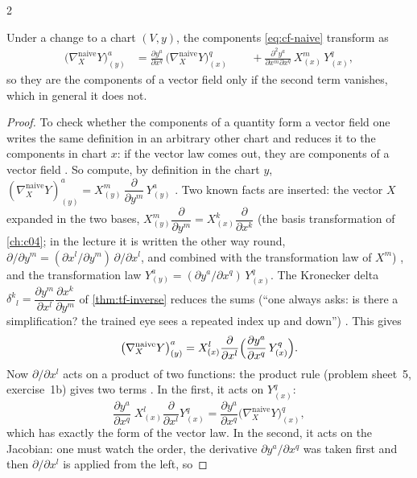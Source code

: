 \begin{paracol}{2}
\begin{theorem}\label{thm:cf-naive-fail}
Under a change to a chart $(V,y)$, the components \eqref{eq:cf-naive} transform as
\begin{align*}
  \bigl(\nabla^{\text{naive}}_XY\bigr)^a_{(y)}
  &=\frac{\partial y^a}{\partial x^q}\,\bigl(\nabla^{\text{naive}}_XY\bigr)^q_{(x)}\
  &\quad+\frac{\partial^2 y^a}{\partial x^m\partial x^q}\,X^m_{(x)}\,Y^q_{(x)} ,
\end{align*}
so they are the components of a vector field only if the second term vanishes, which in general it does not.
\end{theorem}
\begin{proof}
To check whether the components of a quantity form a vector field one writes the same definition in an arbitrary other chart and
reduces it to the components in chart $x$: if the vector law comes out, they are components of a vector field
\ts{6}{1}{25:52}. So compute, by definition in the chart $y$,
$(\nabla^{\text{naive}}_XY)^a_{(y)}=X^m_{(y)}\,\dfrac{\partial}{\partial y^m}\,Y^a_{(y)}$ . Two known facts are inserted:
the vector $X$ expanded in the two bases, $X^m_{(y)}\dfrac{\partial}{\partial y^m}=X^k_{(x)}\dfrac{\partial}{\partial x^k}$ (the basis
transformation of \cref{ch:c04}; in the lecture it is written the other way round, $\partial/\partial y^m=(\partial x^l/\partial y^m)\,\partial/\partial x^l$, and
combined with the transformation law of $X^m$) \ts{6}{1}{27:35}, and the transformation law $Y^a_{(y)}=(\partial y^a/\partial x^q)\,Y^q_{(x)}$. The
Kronecker delta $\delta^k{}_l=\dfrac{\partial y^m}{\partial x^l}\dfrac{\partial x^k}{\partial y^m}$ of \cref{thm:tf-inverse} reduces the sums
(``one always asks: is there a simplification? the trained eye sees a repeated index up and down'') \ts{6}{1}{30:03}. This gives
\[
  \bigl(\nabla^{\text{naive}}_XY\bigr)^a_{(y)}=X^l_{(x)}\frac{\partial}{\partial x^l}\Bigl(\frac{\partial y^a}{\partial x^q}\,Y^q_{(x)}\Bigr).
\]
Now $\partial/\partial x^l$ acts on a product of two functions: the product rule (problem sheet~5, exercise~1b) gives two terms
\ts{6}{1}{32:06}. In the first, it acts on $Y^q_{(x)}$:
\[
  \frac{\partial y^a}{\partial x^q}\;X^l_{(x)}\frac{\partial}{\partial x^l}Y^q_{(x)}
  =\frac{\partial y^a}{\partial x^q}\bigl(\nabla^{\text{naive}}_XY\bigr)^q_{(x)} ,
\]
which has exactly the form of the vector law. In the second, it acts on the Jacobian: one must watch the order, the derivative
$\partial y^a/\partial x^q$ was taken first and then $\partial/\partial x^l$ is applied from the left, so

\end{proof}
\end{paracol}
